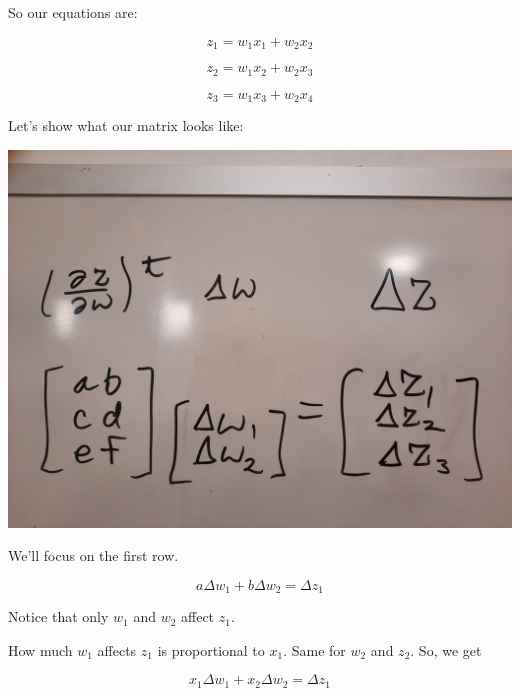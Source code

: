         So our equations are:
        
        \begin{equation*}
            z_1 = w_1x_1 + w_2x_2
        \end{equation*}
        
        \begin{equation*}
            z_2 = w_1x_2 + w_2x_3
        \end{equation*}
        
        \begin{equation*}
            z_3 = w_1x_3 + w_2x_4
        \end{equation*}
        
        Let's show what our matrix looks like:
        
        \includegraphics[width=\textwidth]{images/convolutional_neural_networks_images/WBMatrixDeriv.jpg}
        
        We'll focus on the first row.
        
        \begin{equation}
            a \Delta w_1 + b \Delta w_2 = \Delta z_1
        \end{equation}
        
        Notice that only $w_1$ and $w_2$ affect $z_1$. 
        
        How much $w_1$ affects $z_1$ is proportional to $x_1$. Same for $w_2$ and $z_2$. So, we get 
        
        \begin{equation}
            x_1 \Delta w_1 + x_2 \Delta w_2 = \Delta z_1
        \end{equation}
        
